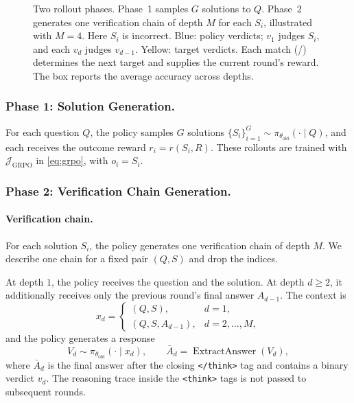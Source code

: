 \documentclass[11pt]{article}
\theoremstyle{definition}
\theoremstyle{plain}
\begin{document}
\begin{figure}[t]
\begin{tikzpicture}
\end{tikzpicture}

\caption{Two rollout phases. Phase~1 samples $G$ solutions to $Q$.
Phase~2 generates one verification chain of depth $M$ for each $S_i$, illustrated with $M=4$. Here $S_i$ is incorrect. Blue: policy verdicts; $v_1$ judges $S_i$, and each $v_d$ judges $v_{d-1}$. Yellow: target verdicts. Each match ({}/{}) determines the next target and supplies the current round's reward. The box reports the average accuracy across depths.}
\label{fig:depth-chain}
\end{figure}


\subsubsection{Phase 1: Solution Generation.}

For each question $Q$, the policy samples $G$ solutions $\{S_i\}_{i=1}^{G}\sim\pi_{\theta_{\mathrm{old}}}(\cdot\mid Q)$, and each receives the outcome reward $r_i=r(S_i,R)$. These rollouts are trained with $\mathcal J_{\mathrm{GRPO}}$ in \eqref{eq:grpo}, with $o_i=S_i$.


\subsubsection{Phase 2: Verification Chain Generation.}

\paragraph{Verification chain.}
For each solution $S_i$, the policy generates one verification chain of depth $M$. We describe one chain for a fixed pair $(Q,S)$ and drop the indices.

At depth $1$, the policy receives the question and the solution.
At depth $d\ge2$, it additionally receives only the previous round's
final answer $A_{d-1}$. The context is
\begin{equation}
x_d=
\begin{cases}
(Q,S), & d=1,\\
(Q,S,A_{d-1}), & d=2,\ldots,M,
\end{cases}
\end{equation}
and the policy generates a response
\begin{equation}
V_d\sim\pi_{\theta_{\mathrm{old}}}(\cdot\mid x_d),
\qquad
\bar A_d=\operatorname{ExtractAnswer}(V_d),
\end{equation}
where $\bar A_d$ is the final answer after the closing
\texttt{</think>} tag and contains a binary verdict $v_d$.
The reasoning trace inside the \texttt{<think>} tags is not
passed to subsequent rounds.
\end{document}

